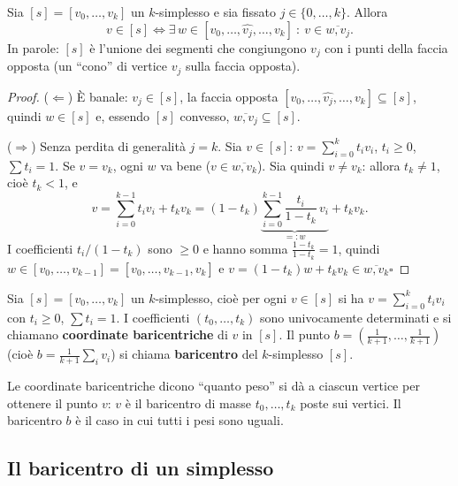 \begin{teo}
Sia $[s] = [v_0, \dots, v_k]$ un $k$-simplesso e sia fissato $j \in \{0, \dots, k\}$. Allora
\[
v \in [s] \iff \exists\, w \in [v_0, \dots, \widehat{v_j}, \dots, v_k] \ : \ v \in \overline{w, v_j}.
\]
In parole: $[s]$ \`e l'unione dei segmenti che congiungono $v_j$ con i punti della faccia opposta (un ``cono'' di vertice $v_j$ sulla faccia opposta).
\end{teo}
\begin{proof}
($\Leftarrow$) \`E banale: $v_j \in [s]$, la faccia opposta $[v_0, \dots, \widehat{v_j}, \dots, v_k] \subseteq [s]$, quindi $w \in [s]$ e, essendo $[s]$ convesso, $\overline{w, v_j} \subseteq [s]$.

($\Rightarrow$) Senza perdita di generalit\`a $j = k$. Sia $v \in [s]$: $v = \sum_{i=0}^k t_i v_i$, $t_i \geqslant 0$, $\sum t_i = 1$. Se $v = v_k$, ogni $w$ va bene ($v \in \overline{w, v_k}$). Sia quindi $v \neq v_k$: allora $t_k \neq 1$, cio\`e $t_k < 1$, e
\[
v = \sum_{i=0}^{k-1} t_i v_i + t_k v_k = (1 - t_k) \underbrace{\sum_{i=0}^{k-1} \frac{t_i}{1 - t_k}\, v_i}_{=: w} + t_k v_k .
\]
I coefficienti $t_i/(1-t_k)$ sono $\geqslant 0$ e hanno somma $\frac{1-t_k}{1-t_k} = 1$, quindi $w \in [v_0, \dots, v_{k-1}] = [v_0, \dots, v_{k-1}, \widehat{v_k}]$ e $v = (1-t_k)w + t_k v_k \in \overline{w, v_k}$\hfill$\square$
\end{proof}

\begin{definicion}
Sia $[s] = [v_0, \dots, v_k]$ un $k$-simplesso, cio\`e per ogni $v \in [s]$ si ha $v = \sum_{i=0}^k t_i v_i$ con $t_i \geqslant 0$, $\sum t_i = 1$. I coefficienti $(t_0, \dots, t_k)$ sono univocamente determinati e si chiamano \textbf{coordinate baricentriche} di $v$ in $[s]$. Il punto $b = \left( \frac{1}{k+1}, \dots, \frac{1}{k+1} \right)$ (cio\`e $b = \frac{1}{k+1} \sum_i v_i$) si chiama \textbf{baricentro} del $k$-simplesso $[s]$.
\end{definicion}

\begin{intuizione}
Le coordinate baricentriche dicono ``quanto peso'' si d\`a a ciascun vertice per ottenere il punto $v$: $v$ \`e il baricentro di masse $t_0, \dots, t_k$ poste sui vertici. Il baricentro $b$ \`e il caso in cui tutti i pesi sono uguali.
\end{intuizione}


\subsection{Il baricentro di un simplesso}

